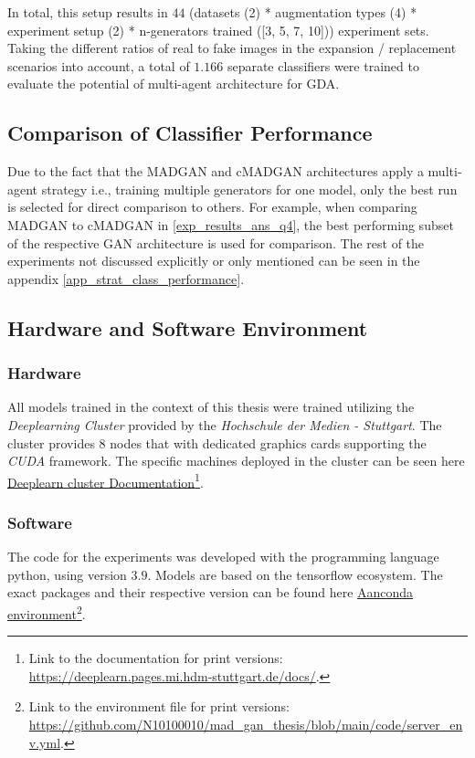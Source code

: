 \noindent In total, this setup results in $44$ (datasets (2) * augmentation types (4) * experiment setup (2) * n-generators trained ([3, 5, 7, 10])) experiment sets. Taking the different ratios of real to fake images in the expansion / replacement scenarios into account, a total of $1.166$ separate classifiers were trained to evaluate the potential of multi-agent architecture for GDA.

\subsection{Comparison of Classifier Performance}
Due to the fact that the MADGAN and cMADGAN architectures apply a multi-agent strategy i.e., training multiple generators for one model, only the best run is selected for direct comparison to others. For example, when comparing MADGAN to cMADGAN in \ref{exp_results_ans_q4}, the best performing subset of the respective GAN architecture is used for comparison. The rest of the experiments not discussed explicitly or only mentioned can be seen in the appendix \ref{app_strat_class_performance}.

\subsection{Hardware and Software Environment}

\subsubsection{Hardware}
All models trained in the context of this thesis were trained utilizing the \textit{Deeplearning Cluster} provided by the \textit{Hochschule der Medien - Stuttgart}. The cluster provides 8 nodes that with dedicated graphics cards supporting the \textit{CUDA} framework. The specific machines deployed in the cluster can be seen here \href{https://deeplearn.pages.mi.hdm-stuttgart.de/docs/}{Deeplearn cluster Documentation}\footnote{Link to the documentation for print versions: \url{https://deeplearn.pages.mi.hdm-stuttgart.de/docs/}.}.

\subsubsection{Software}
The code for the experiments was developed with the programming language python, using version \(3.9\). Models are based on the tensorflow ecosystem. The exact packages and their respective version can be found here \href{https://github.com/N10100010/mad_gan_thesis/blob/main/code/server_env.yml}{Aanconda environment}\footnote{Link to the environment file for print versions: \url{https://github.com/N10100010/mad_gan_thesis/blob/main/code/server_env.yml}.}.



\newpage
